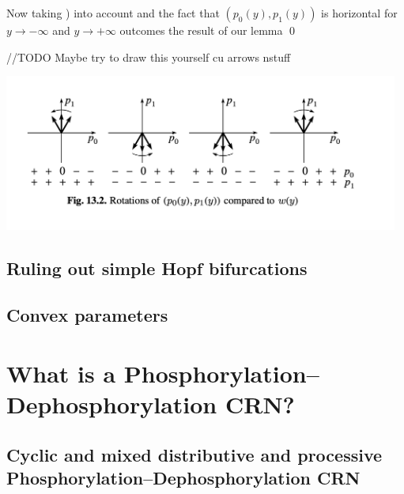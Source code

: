 Now taking ) into account and the fact that $(p_0(y), p_1(y))$ is horizontal for $y \rightarrow  - \infty$ and $y \rightarrow + \infty  $ outcomes the result of our lemma
\qed

//TODO Maybe try to draw this yourself cu arrows nstuff

\includegraphics[width=13cm]{math_pics/sageti-cumse-invart.png}
\subsection{Ruling out simple Hopf bifurcations}

\subsection{Convex parameters}

\section{What is a Phosphorylation–Dephosphorylation CRN?}

\subsection{Cyclic and mixed distributive and processive Phosphorylation–Dephosphorylation CRN}